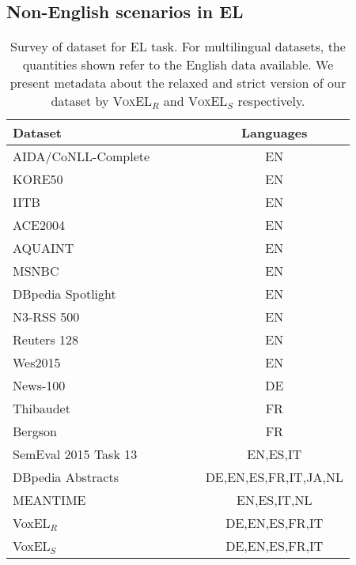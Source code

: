 \documentclass[sigconf]{acmart}
\begin{document}
\subsection{Non-English scenarios in EL}



\newcommand{\ccell}[1]{\multicolumn{1}{c}{#1}}
\begin{table}[tb!]
\centering

\caption{Survey of dataset for EL task. For multilingual datasets, the quantities shown refer to the English data available. We present metadata about the relaxed and strict version of our dataset by \textsc{VoxEL}$_R$ and \textsc{VoxEL}$_S$ respectively.}
\label{tab:datasets} 
\begin{tabular}{lc}
\toprule
\textbf{Dataset}~~~~~~~~~~~~~~~~~~ & \ccell{\textbf{Languages}}\\\midrule
AIDA/CoNLL-Complete~\cite{aida2011}&EN \\\midrule
KORE50~\cite{kore50}                &EN \\\midrule
IITB~\cite{IITB2009}                &EN \\\midrule
ACE2004~\cite{aquaint}              &EN\\\midrule
AQUAINT~\cite{aquaint}              &EN \\\midrule
MSNBC~\cite{cucerzan2007large}      &EN \\\midrule
DBpedia Spotlight
\cite{mendes2011dbpedia}            &EN \\\midrule
N3-RSS 500~\cite{n3}                &EN \\\midrule
Reuters 128~\cite{n3}               &EN \\\midrule
Wes2015~\cite{wes2015}              &EN \\\midrule
News-100~\cite{n3}                  &DE \\\midrule
Thibaudet~\cite{renden2016}         &FR \\\midrule
Bergson~\cite{renden2016}           &FR \\\midrule
SemEval 2015 
Task 13~\cite{moro2015semeval}      &EN,ES,IT \\ \midrule
DBpedia Abstracts
~\cite{abstracts2016}               &DE,EN,ES,FR,IT,JA,NL \\\midrule
MEANTIME \cite{meantime2016}        &EN,ES,IT,NL \\\midrule 
VoxEL$_R$                           &DE,EN,ES,FR,IT\\\midrule  
VoxEL$_S$                           &DE,EN,ES,FR,IT\\ 
\bottomrule
\end{tabular}
\end{table}
\end{document}

